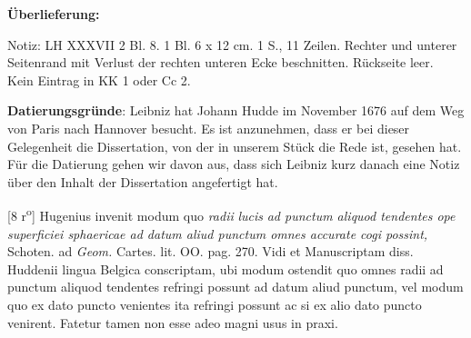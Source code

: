       
               
                \begin{ledgroupsized}[r]{120mm}
                \footnotesize 
                \pstart                
                \noindent\textbf{\"{U}berlieferung:}   
                \pend
                \end{ledgroupsized}
            
              
                            \begin{ledgroupsized}[r]{114mm}
                            \footnotesize 
                            \pstart \parindent -6mm
                            Notiz: LH XXXVII 2 Bl. 8. 1 Bl. 6 x 12 cm. 1 S., 11 Zeilen. Rechter und unterer Seitenrand mit Verlust der rechten unteren Ecke beschnitten. R\"{u}ckseite leer.\\Kein Eintrag in KK 1 oder Cc 2. \pend
                            \end{ledgroupsized}
                \vspace*{5mm}
                \begin{ledgroup}
                \footnotesize 
                \pstart
            \noindent\footnotesize{\textbf{Datierungsgr\"{u}nde}: Leibniz hat Johann Hudde\protect{} im November 1676 auf dem Weg von Paris\protect{} nach Hannover\protect{} besucht. Es ist anzunehmen, dass er bei dieser Gelegenheit die Dissertation, von der in unserem St\"{u}ck die Rede ist, gesehen hat. F\"{u}r die Datierung gehen wir davon aus, dass sich Leibniz kurz danach eine Notiz \"{u}ber den Inhalt der Dissertation angefertigt hat.}
                \pend
                \end{ledgroup}
            
                \vspace*{8mm}
                \pstart 
                \normalsize
            [8 r\textsuperscript{o}] Hugenius\protect{} invenit modum quo \textit{radii }\textit{lucis}\protect{}\textit{ ad punctum aliquod tendentes ope superficiei sphaericae ad datum aliud punctum omnes accurate cogi possint,} Schoten.\protect{} ad \textit{Geom.} Cartes.\protect{} lit. OO. pag. 270. \pend \pstart  Vidi et Manuscriptam diss. Huddenii\protect{} lingua Belgica conscriptam, ubi modum ostendit  quo omnes radii ad punctum aliquod tendentes refringi possunt ad datum aliud punctum, vel modum quo ex dato puncto venientes ita refringi possunt ac si ex alio dato puncto venirent. Fatetur tamen non esse adeo magni usus in praxi. \pend 